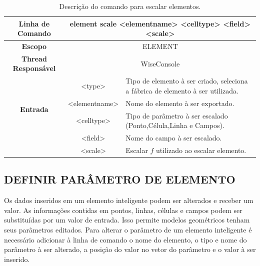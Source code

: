 \documentclass[a4paper,12pt]{monografia}
\theoremstyle{plain}
\theoremstyle{definition}
\theoremstyle{remark}
\begin{document}
\begin{center}
\begin{table}[!htbp]
	\begin{tabular}{|c|c|m{}|}
		\hline
		\textbf{Linha de Comando} & \multicolumn{2}{c|}{element scale <element\underline{\space\space}name> <cell\underline{\space\space}type> <field> <scale>} \\
		\hline
		\textbf{Escopo} & \multicolumn{2}{c|}{ELEMENT} \\
		\hline
		\textbf{Thread Responsável} & \multicolumn{2}{c|}{WiseConsole} \\
		\hline
		\multirow{4}{*}{\textbf{Entrada}} & <type> & Tipo de elemento à ser criado, seleciona a fábrica de elemento à ser utilizada. \\
		
		& <element\underline{\space\space}name> & Nome do elemento à ser exportado. \\
		& <cell\underline{\space\space}type> & Tipo de parâmetro à ser escalado (Ponto,Célula,Linha e Campos). \\
		& <field> & Nome do campo à ser escalado. \\
		& <scale> & Escalar $f$ utilizado ao escalar elemento. \\
		\hline
	\end{tabular}
	\caption{Descrição do comando para escalar elementos.}
	\label{tab:scale_element}
\end{table}
\end{center}

\subsection{DEFINIR PARÂMETRO DE ELEMENTO}\label{sec:set_field_element}

Os dados inseridos em um elemento inteligente podem ser alterados e receber um valor. As informações contidas em pontos, linhas, células e campos podem ser substituídas por um valor de entrada. Isso permite modelos geométricos tenham seus parâmetros editados. Para alterar o parâmetro de um elemento inteligente é necessário adicionar à linha de comando o nome do elemento, o tipo e nome do parâmetro à ser alterado, a posição do valor no vetor do parâmetro e o valor à ser inserido.
\end{document}
